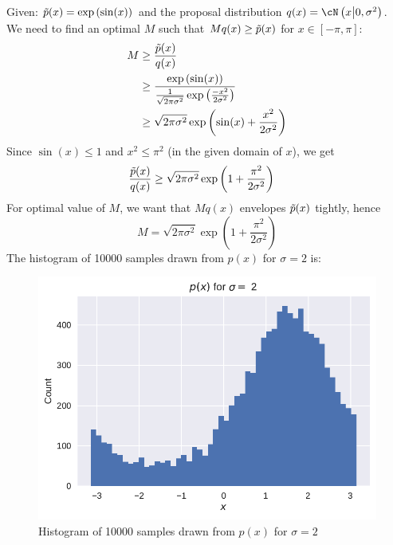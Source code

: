 \documentclass[a4paper,11pt]{article}
\begin{document}
\begin{pmisolution}
\noindent Given: $\Tilde{p}(x) = \exp\left(\sin(x)\right)$ and the proposal distribution $q(x) = \cN\left(x \middle|0, \sigma^2\right)$.\\
We need to find an optimal $M$ such that $Mq(x) \geq \Tilde{p}(x)$ for $x \in [-\pi, \pi]$:
\begin{align}
    M &\geq \frac{\Tilde{p}(x)}{q(x)}\nonumber\\
    &\geq \frac{\exp\left(\sin(x)\right)}{\frac{1}{\sqrt{2 \pi \sigma^2}} \exp \left( \frac{- x^2}{2 \sigma^2} \right)}\nonumber\\
    &\geq \sqrt{2 \pi \sigma^2} \exp{\left(\sin(x) +  \frac{ x^2}{2 \sigma^2} \right)}\nonumber
\end{align}
Since $\sin(x) \leq 1$ and $x^2 \leq \pi^2$ (in the given domain of $x$), we get
\begin{align}
   \frac{\Tilde{p}(x)}{q(x)} &\geq \sqrt{2 \pi \sigma^2} \exp{\left(1 +  \frac{ \pi^2}{2 \sigma^2} \right)}\nonumber
\end{align}
For optimal value of $M$, we want that $Mq(x)$ envelopes $\Tilde{p}(x)$ tightly, hence
\begin{equation*}
    M = \sqrt{2 \pi \sigma^2} \exp{\left(1 +  \frac{ \pi^2}{2 \sigma^2} \right)}
\end{equation*}
The histogram of 10000 samples drawn from $p(x)$ for $\sigma=2$ is:
\begin{figure}[H]
    \centering
    \includegraphics[width=0.6\linewidth]{"rejection_sampling.pdf"}
    \caption{Histogram of 10000 samples drawn from $p(x)$ for $\sigma=2$}
    \label{fig:plt}
\end{figure}
\end{pmisolution}
\end{document}
